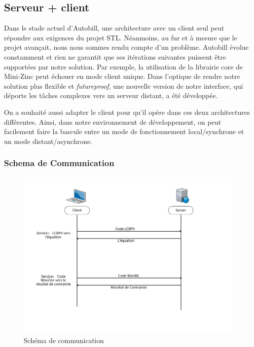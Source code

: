 \documentclass[12pt]{article}
\begin{document}
\hypertarget{serveur-client}{%
      \subsection{Serveur + client}\label{serveur-client}}

Dans le stade actuel d'Autobill, une architecture avec un client seul
peut répondre aux exigences du projet STL. Néanmoins, au fur et à mesure que le projet avançait, nous nous sommes rendu compte d'un problème. Autobill évolue constamment et rien ne garantit que ses itérations suivantes puissent
être supportées par notre solution. Par exemple, la utilisation de la librairie core de Mini-Zinc peut échouer en mode client unique. Dans l'optique de rendre notre solution plus flexible et \emph{futureproof}, une nouvelle version de notre interface, qui déporte les tâches complexes vers un serveur
distant, a été développée.

On a souhaité aussi adapter le client pour qu'il opère dans ces deux
architectures différentes. Ainsi, dans notre environnement de
développement, on peut facilement faire la bascule entre un mode de
fonctionnement local/synchrone et un mode distant/asynchrone.

\hypertarget{schuxe9ma-de-communication}{%
      \subsubsection{Schema de Communication}\label{schuxe9ma-de-communication}}

\begin{figure}[!b]
      \centering
      \includegraphics[scale=0.5]{Figures/Communication.png}
      \caption{Schéma de communication}
\end{figure}
\end{document}
